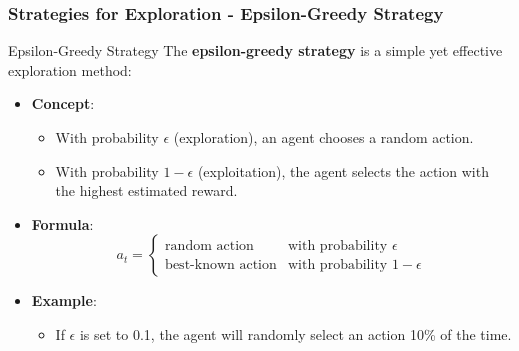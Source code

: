 \documentclass[aspectratio=169]{beamer}
\begin{document}
\begin{frame}[fragile]
    \frametitle{Strategies for Exploration - Epsilon-Greedy Strategy}
    \begin{block}{Epsilon-Greedy Strategy}
        The \textbf{epsilon-greedy strategy} is a simple yet effective exploration method:
    \end{block}
    \begin{itemize}
        \item \textbf{Concept}:
        \begin{itemize}
            \item With probability $\epsilon$ (exploration), an agent chooses a random action.
            \item With probability $1 - \epsilon$ (exploitation), the agent selects the action with the highest estimated reward.
        \end{itemize}
        \item \textbf{Formula}:
        \begin{equation}
            a_t = 
            \begin{cases} 
            \text{random action} & \text{with probability } \epsilon \\
            \text{best-known action} & \text{with probability } 1 - \epsilon 
            \end{cases}
        \end{equation}
        \item \textbf{Example}:
        \begin{itemize}
            \item If $\epsilon$ is set to 0.1, the agent will randomly select an action 10\% of the time.
        \end{itemize}
    \end{itemize}
\end{frame}
\end{document}
